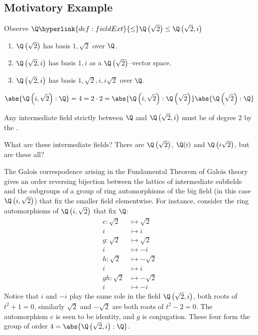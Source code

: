 \documentclass{article}
\begin{document}
\subsection{Motivatory Example}
Observe $\Q \hyperlink{def:fieldExt}{\leq} \Q\left(\sqrt{2}\right) \leq \Q\left(\sqrt{2}, i\right)$
\begin{enumerate}[label=(\roman*)]
    \item $\Q\left(\sqrt{2}\right)$ has basis $1, \sqrt{2}$ over $\Q$.
    \item $\Q\left(\sqrt{2}, i\right)$ has basis $1, i$ as a $\Q\left(\sqrt{2}\right)$--vector space.
    \item $\Q\left(\sqrt{2}, i\right)$ has basis $1, \sqrt{2}, i, i\sqrt{2}$ over $\Q$.
\end{enumerate}
\begin{equation*}
    \abs{\Q\left(i, \sqrt{2}\right):\Q} = 4 = 2 \cdot 2 = \abs{\Q\left(i, \sqrt{2}\right) : \Q\left(\sqrt{2}\right)} \abs{\Q\left(\sqrt{2}\right):\Q}
\end{equation*}

Any intermediate field strictly between $\Q$ and $\Q\left(\sqrt{2}, i\right)$ must be of degree $2$ by the .


What are these intermediate fields? There are $\Q\left(\sqrt{2}\right)$, $\Q(i)$ and $\Q\left(i\sqrt{2}\right)$, but are these all?

The Galois correspodence arising in the Fundamental Theorem of Galois theory gives an order reversing bijection between the lattice of intermediate subfields and the subgroups of a group of ring automorphisms of the big field (in this case $\Q\left(i, \sqrt{2}\right)$) that fix the smaller field elementwise.
For instance, consider the ring automorphisms of $\Q\left(i, \sqrt{2}\right)$ that fix $\Q$:
\begin{align*}
    e : \sqrt{2} &\longmapsto \sqrt{2} \\
               i &\longmapsto i \\
    g : \sqrt{2} &\longmapsto \sqrt{2} \\
               i &\longmapsto -i \\
    h : \sqrt{2} &\longmapsto -\sqrt{2} \\
               i &\longmapsto i \\
    gh: \sqrt{2} &\longmapsto -\sqrt{2} \\
               i &\longmapsto -i
\end{align*}
Notice that $i$ and $-i$ play the same role in the field $\Q\left(\sqrt{2}, i\right)$, both roots of $t^2 + 1 = 0$, similarly $\sqrt{2}$ and $-\sqrt{2}$ are both roots of $t^2 - 2 = 0$.  The automorphism $e$ is seen to be identity, and $g$ is conjugation.
These four form the group of order $4 = \abs{\Q\left(\sqrt{2}, i\right) : \Q}$.
\end{document}
